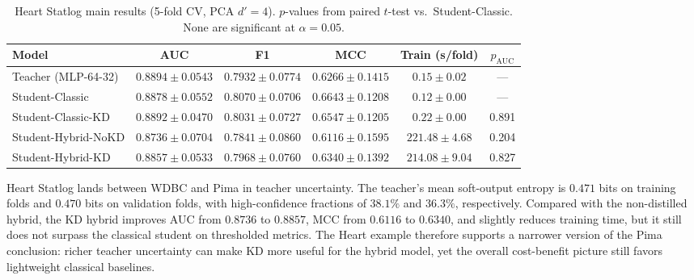 \documentclass[11pt,a4paper]{article}
\begin{document}
\begin{table}[t]
\caption{Heart Statlog main results (5-fold CV, PCA $d'=4$). $p$-values from paired $t$-test vs.\ Student-Classic. None are significant at $\alpha{=}0.05$.}
\label{tab:heart_main}
\centering\small
\setlength{\tabcolsep}{4pt}
\begin{tabular}{lccccc}
\toprule
Model & AUC & F1 & MCC & Train (s/fold) & $p_{\text{AUC}}$ \\
\midrule
Teacher (MLP-64-32) & $0.8894 \pm 0.0543$ & $0.7932 \pm 0.0774$ & $0.6266 \pm 0.1415$ & $0.15 \pm 0.02$ & --- \\
\midrule
Student-Classic     & $0.8878 \pm 0.0552$ & $0.8070 \pm 0.0706$ & $0.6643 \pm 0.1208$ & $0.12 \pm 0.00$ & --- \\
Student-Classic-KD  & $0.8892 \pm 0.0470$ & $0.8031 \pm 0.0727$ & $0.6547 \pm 0.1205$ & $0.22 \pm 0.00$ & 0.891 \\
Student-Hybrid-NoKD & $0.8736 \pm 0.0704$ & $0.7841 \pm 0.0860$ & $0.6116 \pm 0.1595$ & $221.48 \pm 4.68$ & 0.204 \\
Student-Hybrid-KD   & $0.8857 \pm 0.0533$ & $0.7968 \pm 0.0760$ & $0.6340 \pm 0.1392$ & $214.08 \pm 9.04$ & 0.827 \\
\bottomrule
\end{tabular}
\end{table}

Heart Statlog lands between WDBC and Pima in teacher uncertainty. The teacher's mean soft-output
entropy is $0.471$ bits on training folds and $0.470$ bits on validation folds, with high-confidence
fractions of $38.1\%$ and $36.3\%$, respectively. Compared with the non-distilled hybrid, the KD
hybrid improves AUC from $0.8736$ to $0.8857$, MCC from $0.6116$ to $0.6340$, and slightly reduces
training time, but it still does not surpass the classical student on thresholded metrics. The
Heart example therefore supports a narrower version of the Pima conclusion: richer teacher
uncertainty can make KD more useful for the hybrid model, yet the overall cost-benefit picture
still favors lightweight classical baselines.
\end{document}
